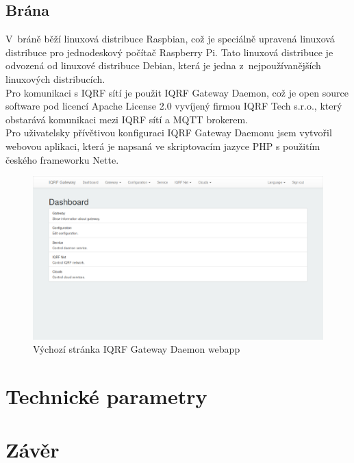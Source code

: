 \documentclass[12pt,a4paper]{article}
\begin{document}
\newpage

\subsection{Brána}

V~bráně běží linuxová distribuce Raspbian, což je speciálně upravená linuxová distribuce pro jednodeskový počítač Raspberry Pi. Tato linuxová distribuce je odvozená od linuxové distribuce Debian, která je jedna z~nejpoužívanějších linuxových distribucích. \\
Pro komunikaci s IQRF sítí je použit IQRF Gateway Daemon\cite{iqrfsdk/iqrf-daemon}, což je open source software pod licencí Apache License 2.0 vyvíjený firmou IQRF Tech s.r.o., který obstarává komunikaci mezi IQRF sítí a MQTT brokerem. \\
Pro uživatelsky přívětivou konfiguraci IQRF Gateway Daemonu jsem vytvořil webovou aplikaci\cite{iqrfsdk/iqrf-daemon-webapp}, která je napsaná ve skriptovacím jazyce PHP s použitím českého frameworku Nette\cite{nette}.

\begin{figure}[H]
\centering
\label{fig:foto/iqrf-os}
\includegraphics[width = 150mm]{img/iqrf/iqrf-daemon-webapp.png}
\caption{Výchozí stránka IQRF Gateway Daemon webapp}
\end{figure}

\newpage

\section{Technické parametry}

\newpage

\section*{Závěr}
\end{document}
